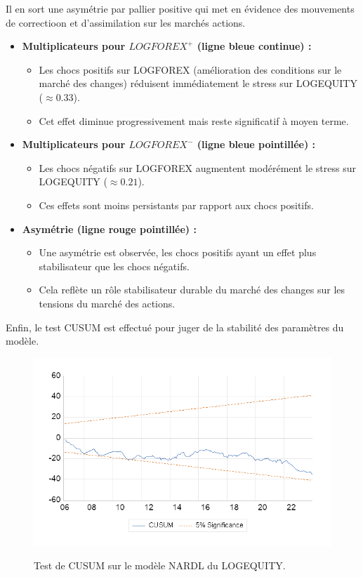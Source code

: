 Il en sort une asymétrie par pallier positive qui met en évidence des mouvements de correctioon et d'assimilation sur les marchés actions.

\begin{itemize}
    \item \textbf{Multiplicateurs pour $LOGFOREX^+$ (ligne bleue continue) :}
    \begin{itemize}
        \item Les chocs positifs sur LOGFOREX (amélioration des conditions sur le marché des changes) réduisent immédiatement le stress sur LOGEQUITY (\(\approx 0.33\)).
        \item Cet effet diminue progressivement mais reste significatif à moyen terme.
    \end{itemize}

    \item \textbf{Multiplicateurs pour $LOGFOREX^-$ (ligne bleue pointillée) :}
    \begin{itemize}
        \item Les chocs négatifs sur LOGFOREX augmentent modérément le stress sur LOGEQUITY (\(\approx 0.21\)).
        \item Ces effets sont moins persistants par rapport aux chocs positifs.
    \end{itemize}

    \item \textbf{Asymétrie (ligne rouge pointillée) :}
    \begin{itemize}
        \item Une asymétrie est observée, les chocs positifs ayant un effet plus stabilisateur que les chocs négatifs.
        \item Cela reflète un rôle stabilisateur durable du marché des changes sur les tensions du marché des actions.
    \end{itemize}
\end{itemize}

\vspace{0.5cm}

Enfin, le test CUSUM est effectué pour juger de la stabilité des paramètres du modèle.

\begin{figure}[H]
    \centering
    \caption{Test de CUSUM sur le modèle NARDL du LOGEQUITY.}
    \includegraphics{annexes/cusum_nardl_logequity.png}
    \label{fig:cusum_logequity}
\end{figure}

